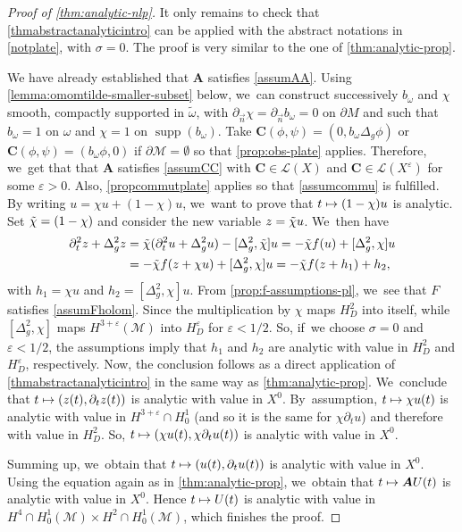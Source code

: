 \documentclass[10pt]{amsart}
\newcommand\mto{\mathchoice{\longmapsto}{\mapsto}{\mapsto}{\mapsto}}
\DeclareMathOperator{\supp}{\mathrm{supp}}
\theoremstyle{definition}
\let\mc\mathcal
\let\veps\varepsilon
\newcommand{\M}{\mc{M}}
\newcommand{\bC}{\boldsymbol{C}}
\newcommand{\bA}{\boldsymbol{A}}
\begin{document}
\begin{proof}[Proof of \cref{thm:analytic-nlp}]
It only remains to check that \cref{thmabstractanalyticintro} can be applied with the abstract notations in \cref{notplate}, with $\sigma=0$. The proof is very similar to the one of \cref{thm:analytic-prop}.

We have already established that $\bA$ satisfies \cref{assumAA}. Using \cref{lemma:omomtilde-smaller-subset} below, we~can construct successively $b_{\omega}$ and $\chi$ smooth, compactly supported in $\widetilde{\omega}$, with $\partial_{\vec n}\chi=\partial_{\vec n}b_{\omega}=0$ on $\partial M$ and such that $b_{\omega}=1$ on $\omega$ and $\chi=1$ on $\supp(b_{\omega})$. Take $\bC(\phi, \psi)=(0,b_\omega \Delta_g \phi)$ or $\bC(\phi, \psi)=(b_\omega \phi,0)$ if $\partial \M=\emptyset$ so that \cref{prop:obs-plate} applies. Therefore, we~get that that $\bA$ satisfies \cref{assumCC} with $\bC\in \mc{L}(X)$ and $\bC\in \mc{L}(X^\veps)$ for some $\veps>0$. Also, \cref{propcommutplate} applies so that \cref{assumcommu} is fulfilled.
By writing $u=\chi u+(1-\chi)u$, we~want to prove that $t\mto (1-\chi)u$ is analytic. Set $\Tilde{\chi}=(1-\chi)$ and consider the new variable $z=\Tilde{\chi} u$. We~then have
\begin{align*}
\partial_t^2 z+\Delta_g^2 z &=\Tilde{\chi}(\partial_t^2 u+\Delta_g^2 u)-[\Delta_g^2, \Tilde{\chi}]u=-\Tilde{\chi} f(u)+[\Delta_g^2, \chi]u\\
&=-\Tilde{\chi} f(z+\chi u)+[\Delta_g^2, \chi]u=-\Tilde{\chi} f(z+h_1)+h_2,
\end{align*}
with $h_1=\chi u$ and $h_2=[\Delta_g^2,\chi]u$. From \cref{prop:f-assumptions-pl}, we~see that $F$ satisfies \cref{assumFholom}. Since the multiplication by $\chi$ maps $H^2_D$ into itself, while $[\Delta_g^2,\chi]$ maps $H^{3+\veps}(\M)$ into $H^{\veps}_D$ for $\veps<1/2$. So, if~we choose $\sigma=0$ and $\veps<1/2$, the assumptions imply that $h_1$ and $h_2$ are analytic with value in $H^2_D$ and $H^{\veps}_D$, respectively. Now, the conclusion follows as a direct application of \cref{thmabstractanalyticintro} in the same way as \cref{thm:analytic-prop}. We~conclude that $t\mto (z(t), \partial_t z(t))$ is analytic with value in $X^0$. By~assumption, $t\mto \chi u(t)$ is analytic with value in $H^{3+\veps}\cap H_0^1$ (and so it is the same for $\chi \partial_t u$) and therefore with value in $H^2_D$. So, $t\mto (\chi u(t),\chi\partial_t u(t))$ is analytic with value in $X^0$.

Summing up, we~obtain that $t\mto ( u(t),\partial_t u(t))$ is analytic with value in $X^0$. Using the equation again as in \cref{thm:analytic-prop}, we~obtain that $t\mto \bA U(t)$ is analytic with value in $X^0$. Hence $t\mto U(t)$ is analytic with value in $H^4\cap H_0^1(\M)\times H^2\cap H_0^1(\M)$, which finishes the proof.
\end{proof}
\end{document}
